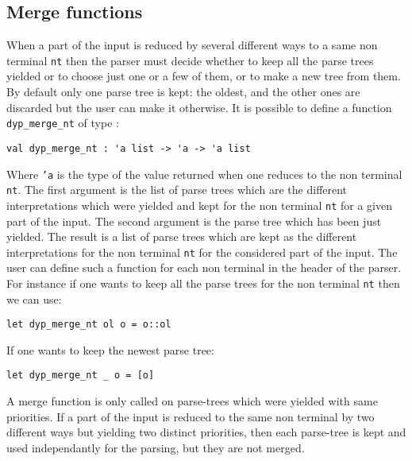 \documentclass[12pt]{article}
\begin{document}
{\subsection{Merge functions}\label{merge}

When a part of the input is reduced by several different ways to a same non terminal \texttt{nt} then the parser must decide whether to keep all the parse trees yielded or to choose just one or a few of them, or to make a new tree from them. By default only one parse tree is kept: the oldest, and the other ones are discarded but the user can make it otherwise. It is possible to define a function \verb|dyp_merge_nt| of type :
\begin{verbatim}
val dyp_merge_nt : 'a list -> 'a -> 'a list
\end{verbatim}
Where \texttt{'a} is the type of the value returned when one reduces to the non terminal \texttt{nt}. The first argument is the list of parse trees which are the different interpretations which were yielded and kept for the non terminal \texttt{nt} for a given part of the input. The second argument is the parse tree which has been just yielded. The result is a list of parse trees which are kept as the different interpretations for the non terminal \texttt{nt} for the considered part of the input. The user can define such a function for each non terminal in the header of the parser.\\

For instance if one wants to keep all the parse trees for the non terminal \texttt{nt} then we can use:
\begin{verbatim}
let dyp_merge_nt ol o = o::ol
\end{verbatim}
If one wants to keep the newest parse tree:
\begin{verbatim}
let dyp_merge_nt _ o = [o]
\end{verbatim}

A merge function is only called on parse-trees which were yielded with same priorities. If a part of the input is reduced to the same non terminal by two different ways but yielding two distinct priorities, then each parse-tree is kept and used independantly for the parsing, but they are not merged.\\

}
\end{document}
